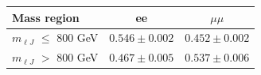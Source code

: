 \begin{table}[htp]
  \label{tab:emu_tf_boosted_RunIII2024Summer24}
  \centering
  \begin{tabular}{l | c c}
    \hline
    Mass region & ee & $\mu\mu$ \\
    \hline
    $m_{\ell J}$ $\leq$ 800 GeV & $0.546 \pm 0.002$ & $0.452 \pm 0.002$ \\
    $m_{\ell J}$ $>$ 800 GeV & $0.467 \pm 0.005$ & $0.537 \pm 0.006$ \\
    \hline
  \end{tabular}
\end{table}
